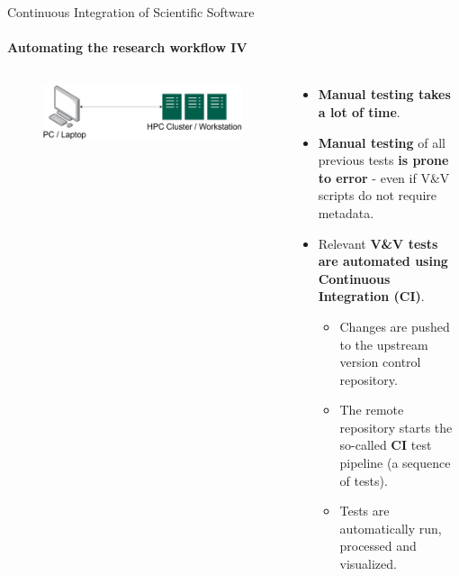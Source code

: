 \begin{frame}{Continuous Integration of Scientific Software}
    \framesubtitle{Automating the research workflow IV} 
    \vfill

        \begin{columns}
            \begin{column}[c]{0.5\textwidth}
                \begin{figure}
                    \centering
                    \includegraphics[width=\columnwidth]{figures/workflow-overview.png}
                \end{figure}
            \end{column}
            \begin{column}[c]{0.5\textwidth}
                \begin{itemize}
                    \item \textbf{Manual testing takes a lot of time}. 
                    \item \textbf{Manual testing} of all previous tests \textbf{is prone to error} - even if V\&V scripts do not require metadata. 
                    \item Relevant \textbf{V\&V tests are automated using Continuous Integration (CI)}.  
                    \begin{itemize}
                        \item Changes are pushed to the upstream version control repository.  
                        \item The remote repository starts the so-called \textbf{CI} test pipeline (a sequence of tests). 
                        \item Tests are automatically run, processed and visualized. 
                    \end{itemize}
                \end{itemize}
            \end{column}
        \end{columns}
\end{frame}

